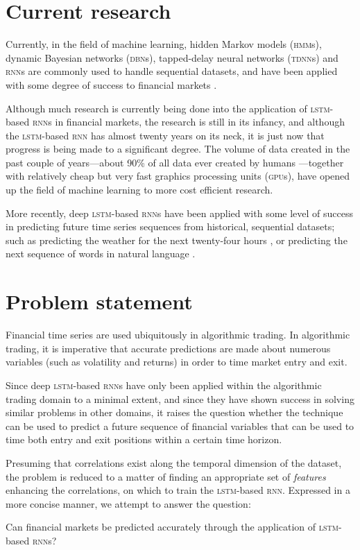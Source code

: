 \section{Current research}
Currently, in the field of machine learning, hidden Markov models
(\textsc{hmm}s), dynamic Bayesian networks (\textsc{dbn}s), tapped-delay neural
networks (\textsc{tdnn}s) and \textsc{rnn}s are commonly used to handle
sequential datasets, and have been applied with some degree of success to
financial markets \citep{saad1998,kita2012,zhang2004}.

Although much research is currently being done into the application of
\textsc{lstm}-based \textsc{rnn}s in financial markets, the research is still in
its infancy, and although the \textsc{lstm}-based \textsc{rnn} has almost twenty
years on its neck, it is just now that progress is being made to a significant
degree.  The volume of data created in the past couple of years---about 90\% of
all data ever created by humans \citep*{devakunchari2014}---together with
relatively cheap but very fast graphics processing units (\textsc{gpu}s), have
opened up the field of machine learning to more cost efficient research.

More recently, deep \textsc{lstm}-based \textsc{rnn}s have been applied with
some level of success in predicting future time series sequences from
historical, sequential datasets; such as predicting the weather for the next
twenty-four hours \citep*{zaytar2016}, or predicting the next sequence of words
in natural language \citep*{quoc2014}.

\section{Problem statement}
Financial time series are used ubiquitously in algorithmic trading.  In
algorithmic trading, it is imperative that accurate predictions are made about
numerous variables (such as volatility and returns) in order to time market
entry and exit.

Since deep \textsc{lstm}-based \textsc{rnn}s have only been applied within the
algorithmic trading domain to a minimal extent, and since they have shown
success in solving similar problems in other domains, it raises the question
whether the technique can be used to predict a future sequence of financial
variables that can be used to time both entry and exit positions within a
certain time horizon.

Presuming that correlations exist along the temporal dimension of the dataset,
the problem is reduced to a matter of finding an appropriate set of
\textit{features} enhancing the correlations, on which to train the
\textsc{lstm}-based \textsc{rnn}.  Expressed in a more concise manner, we
attempt to answer the question:

Can financial markets be predicted accurately through the application of
\textsc{lstm}-based \textsc{rnn}s?
